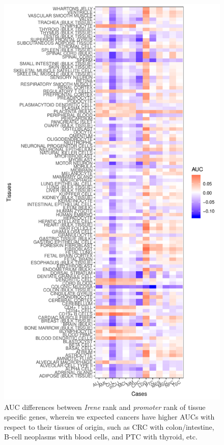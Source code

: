 \documentclass[a4paper,12pt]{article}
\begin{document}
\begin{figure}[!htb]
\centering
\includegraphics[scale=0.78]{figs/tissueAUC.pdf}
\caption{AUC differences between {\em Irene} rank and {\em promoter} rank of tissue specific genes, wherein we expected cancers have higher AUCs with respect to their tissues of origin, such as CRC with colon/intestine, B-cell neoplasms with blood cells, and PTC with thyroid, etc. }
\label{fig:rnd}
\end{figure}
\end{document}

